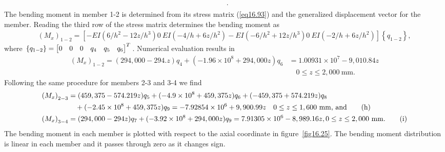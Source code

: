 \documentclass{AeroStructure-ERJohnson}
\begin{document}
\begin{example}
\begin{align}
\begin{split}
\end{split}.
\end{align}
The bending moment in member 1-2 is determined from its stress matrix (\ref{eq16.93}) and the generalized displacement vector for the member. Reading the third row of the stress matrix determines the bending moment as
\begin{align}\label{eq16.8f}\tag{f}
(M_{x})_{1-2}=\left[-E I(6 / h^{2}-12 z / h^{3}) 0\ E I(-4 / h+6 z / h^{2})-E I(-6 / h^{2}+12 z / h^{3}) 0\ E I(-2 / h+6 z / h^{2})\right]\left\{q_{1-2}\right\},
\end{align}
where $\left\{q_{1-2}\right\}=\left[\begin{array}{@{}llllll@{}}0 & 0 & 0 & q_{4} & q_{5} & q_{6}\end{array}\right]^{T}$. Numerical evaluation results in
\begin{align}
\left(M_{x}\right)_{1-2}=(294,000-294 . z) q_{4}+(-1.96 \times 10^{8}+294,000 z) q_{6} &=1.00931 \times 10^{7}-9,010.84 z \nonumber\\
&\quad 0 \leq z \leq 2,000 \mathrm{~mm}.\label{eq16.8g}\tag{g}
\end{align}
Following the same procedure for members 2-3 and 3-4 we find
\begin{align}
\left(M_{x}\right)_{2-3} &=(459,375-574.219 {z}) q_{5}+(-4.9 \times 10^{8}+459,375 {z}) q_{6}+(-459,375+574.219 {z}) q_{8} \nonumber\\
&\quad +(-2.45 \times 10^{8}+459,375 {z}) q_{9}=-7.92854 \times 10^{6}+9,900.99 {z} \quad 0 \leq {z} \leq 1,600 \mathrm{~mm}\mbox{, and}\label{eq16.8h}\tag{h}\\
\hspace*{-4pt}\left(M_{x}\right)_{3-4} &=(294,000-294 {z}) q_{7}+(-3.92 \times 10^{8}+294,000 {z}) q_{9}=7.91305 \times 10^{6}-8,989.16 {z}, 0 \leq {z} \leq 2,000 \mathrm{~mm}.\label{eq16.8i}\tag{i}
\end{align}
The bending moment in each member is plotted with respect to the axial coordinate in figure~\ref{fig16.25}. The bending moment distribution is linear in each member and it passes through zero as it changes sign.
\end{example}

\end{document}
